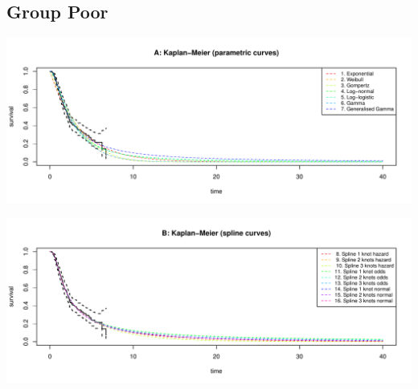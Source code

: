 \documentclass[]{article}
\begin{document}
\newpage

\subsection{Group Poor}\label{group-poor}

\begin{flushleft}\includegraphics[height=0.29\textheight]{Images/validate_extrapolation3-1} \end{flushleft}

\begin{flushleft}\includegraphics[height=0.29\textheight]{Images/validate_extrapolation3-2} \end{flushleft}
\end{document}
